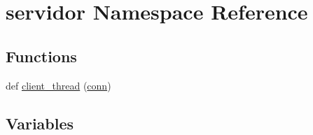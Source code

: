 \hypertarget{namespaceservidor}{}\section{servidor Namespace Reference}
\label{namespaceservidor}
\subsection*{Functions}
\begin{DoxyCompactItemize}
\item 
def \hyperlink{namespaceservidor_a8548dd2cea1eb0587af6521b18bbc989}{client\+\_\+thread} (\hyperlink{namespaceservidor_a6c80b4f26b7083ecd69b24985e6f9d1e}{conn})
\end{DoxyCompactItemize}
\subsection*{Variables}
